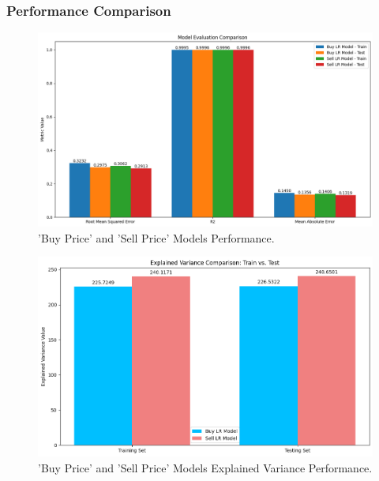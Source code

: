 \subsubsection{Performance Comparison}\text{}


\begin{figure}[H]
    \centering
    \includegraphics[width=0.8\linewidth]{images/rmse_r2_mae}
    \caption{'Buy Price' and 'Sell Price' Models Performance.}
    \label{fig:rmse_r2_mae}
\end{figure}

\begin{figure}[H]
    \centering
    \includegraphics[width=0.8\linewidth]{images/train_test_var}
    \caption{'Buy Price' and 'Sell Price' Models Explained Variance Performance.}
    \label{fig:train_test_var}
\end{figure}